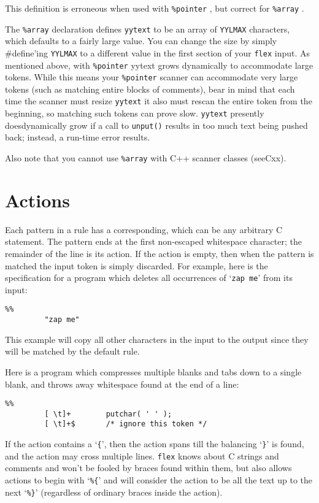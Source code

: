 \documentclass[openany,oneside]{book}
\begin{document}
This definition is erroneous when used with \verb`%pointer` , but correct
for \verb`%array` .

The \verb`%array` declaration defines \verb`yytext` to be an array of \verb`YYLMAX` characters, which defaults to a fairly large value.  You
can change the size by simply \#{}define'ing \verb`YYLMAX` to a different
value in the first section of your \verb`flex` input.  As mentioned
above, with \verb`%pointer` yytext grows dynamically to accommodate
large tokens.  While this means your \verb`%pointer` scanner can
accommodate very large tokens (such as matching entire blocks of
comments), bear in mind that each time the scanner must resize \verb`yytext` it also must rescan the entire token from the beginning,
so matching such tokens can prove slow. \verb`yytext` presently doesdynamically grow if a call to \verb`unput()` results in too
much text being pushed back; instead, a run-time error results.

Also note that you cannot use \verb`%array` with C++ scanner classes
(seeCxx).
\chapter{Actions}


Each pattern in a rule has a corresponding, which can be
any arbitrary C statement.  The pattern ends at the first non-escaped
whitespace character; the remainder of the line is its action.  If the
action is empty, then when the pattern is matched the input token is
simply discarded.  For example, here is the specification for a program
which deletes all occurrences of ‘\verb`zap me`’ from its input:


\begin{verbatim}
%%
         "zap me"
\end{verbatim}


This example will copy all other characters in the input to the output
since they will be matched by the default rule.

Here is a program which compresses multiple blanks and tabs down to a
single blank, and throws away whitespace found at the end of a line:


\begin{verbatim}
%%
         [ \t]+        putchar( ' ' );
         [ \t]+$       /* ignore this token */
\end{verbatim}


If the action contains a ‘\verb`{`’, then the action spans till the
balancing ‘\verb`}`’ is found, and the action may cross multiple lines. \verb`flex` knows about C strings and comments and won't be fooled by
braces found within them, but also allows actions to begin with
‘\verb`%{`’ and will consider the action to be all the text up to the
next ‘\verb`%}`’ (regardless of ordinary braces inside the action).
\end{document}
